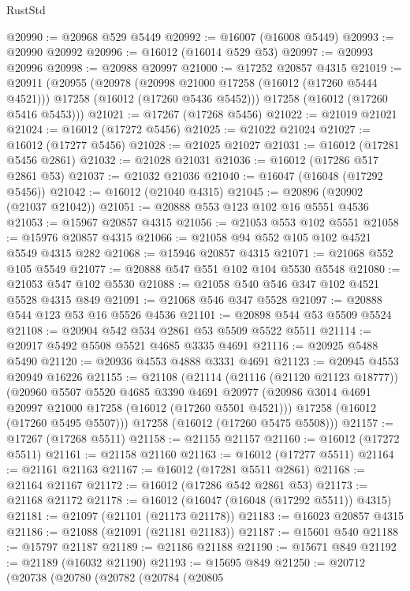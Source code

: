 \begin{lexlean}{RustStd}
\begin{coremodule}
@20990 := @20968 @529 @5449
@20992 := @16007 (@16008 @5449)
@20993 := @20990 @20992
@20996 := @16012 (@16014 @529 @53)
@20997 := @20993 @20996
@20998 := @20988 @20997
@21000 := @17252 @20857 @4315
@21019 := @20911
    (@20955
      (@20978
        (@20998 @21000 @17258 (@16012 (@17260 @5444 @4521)))
        @17258
        (@16012 (@17260 @5436 @5452)))
      @17258
      (@16012 (@17260 @5416 @5453)))
@21021 := @17267 (@17268 @5456)
@21022 := @21019 @21021
@21024 := @16012 (@17272 @5456)
@21025 := @21022 @21024
@21027 := @16012 (@17277 @5456)
@21028 := @21025 @21027
@21031 := @16012 (@17281 @5456 @2861)
@21032 := @21028 @21031
@21036 := @16012 (@17286 @517 @2861 @53)
@21037 := @21032 @21036
@21040 := @16047 (@16048 (@17292 @5456))
@21042 := @16012 (@21040 @4315)
@21045 := @20896 (@20902 (@21037 @21042))
@21051 := @20888 @553 @123 @102 @16 @5551 @4536
@21053 := @15967 @20857 @4315
@21056 := @21053 @553 @102 @5551
@21058 := @15976 @20857 @4315
@21066 := @21058 @94 @552 @105 @102 @4521 @5549 @4315 @282
@21068 := @15946 @20857 @4315
@21071 := @21068 @552 @105 @5549
@21077 := @20888 @547 @551 @102 @104 @5530 @5548
@21080 := @21053 @547 @102 @5530
@21088 := @21058 @540 @546 @347 @102 @4521 @5528 @4315 @849
@21091 := @21068 @546 @347 @5528
@21097 := @20888 @544 @123 @53 @16 @5526 @4536
@21101 := @20898 @544 @53 @5509 @5524
@21108 := @20904 @542 @534 @2861 @53 @5509 @5522 @5511
@21114 := @20917 @5492 @5508 @5521 @4685 @3335 @4691
@21116 := @20925 @5488 @5490
@21120 := @20936 @4553 @4888 @3331 @4691
@21123 := @20945 @4553 @20949 @16226
@21155 := @21108
    (@21114
      (@21116 (@21120 @21123 @18777))
      (@20960
        @5507
        @5520
        @4685
        @3390
        @4691
        @20977
        (@20986 @3014 @4691 @20997 @21000 @17258 (@16012 (@17260 @5501 @4521)))
        @17258
        (@16012 (@17260 @5495 @5507)))
      @17258
      (@16012 (@17260 @5475 @5508)))
@21157 := @17267 (@17268 @5511)
@21158 := @21155 @21157
@21160 := @16012 (@17272 @5511)
@21161 := @21158 @21160
@21163 := @16012 (@17277 @5511)
@21164 := @21161 @21163
@21167 := @16012 (@17281 @5511 @2861)
@21168 := @21164 @21167
@21172 := @16012 (@17286 @542 @2861 @53)
@21173 := @21168 @21172
@21178 := @16012 (@16047 (@16048 (@17292 @5511)) @4315)
@21181 := @21097 (@21101 (@21173 @21178))
@21183 := @16023 @20857 @4315
@21186 := @21088 (@21091 (@21181 @21183))
@21187 := @15601 @540
@21188 := @15797 @21187
@21189 := @21186 @21188
@21190 := @15671 @849
@21192 := @21189 (@16032 @21190)
@21193 := @15695 @849
@21250 := @20712
    (@20738
      (@20780
        (@20782
          (@20784
            (@20805

\end{coremodule}
\end{lexlean}
